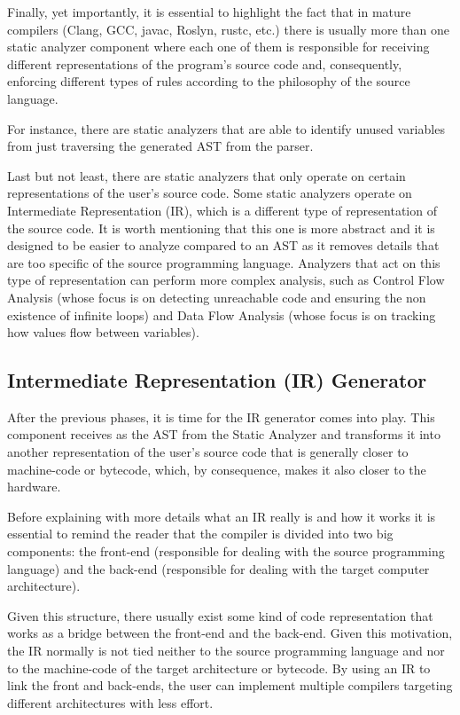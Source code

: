 Finally, yet importantly, it is essential to highlight the fact that in mature compilers (Clang, GCC, javac, Roslyn, rustc, etc.) there is usually more than one static analyzer component where each one of them is responsible for receiving different representations of the program's source code and, consequently, enforcing different types of rules according to the philosophy of the source language.

For instance, there are static analyzers that are able to identify unused variables from just traversing the generated AST from the parser.

Last but not least, there are static analyzers that only operate on certain representations of the user's source code. Some static analyzers operate on Intermediate Representation (IR), which is a different type of representation of the source code. It is worth mentioning that this one is more abstract and it is designed to be easier to analyze compared to an AST as it removes details that are too specific of the source programming language. Analyzers that act on this type of representation can perform more complex analysis, such as Control Flow Analysis (whose focus is on detecting unreachable code and ensuring the non existence of infinite loops) and Data Flow Analysis (whose focus is on tracking how values flow between variables).

\subsection{Intermediate Representation (IR) Generator}
After the previous phases, it is time for the IR generator comes into play. This component receives as the AST from the Static Analyzer and transforms it into another representation of the user's source code that is generally closer to machine-code or bytecode, which, by consequence, makes it also closer to the hardware.

Before explaining with more details what an IR really is and how it works it is essential to remind the reader that the compiler is divided into two big components: the front-end (responsible for dealing with the source programming language) and the back-end (responsible for dealing with the target computer architecture).

Given this structure, there usually exist some kind of code representation that works as a bridge between the front-end and the back-end. Given this motivation, the IR normally is not tied neither to the source programming language and nor to the machine-code of the target architecture or bytecode. By using an IR to link the front and back-ends, the user can implement multiple compilers targeting different architectures with less effort.

